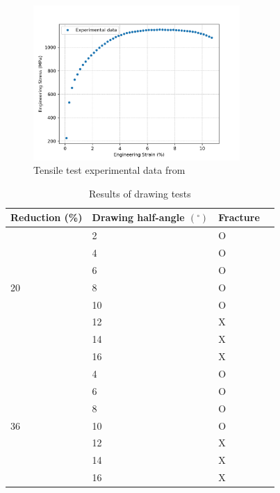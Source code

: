 \documentclass[sn-mathphys,Numbered,draft]{sn-jnl}%
\begin{document}
\begin{figure}[htb]
\begin{center}
	\includegraphics[width=0.7\textwidth]{./Figures/SimulationAndAnalysis/compareExperimentalSimulation/experimentalData.png}
\caption{Tensile test experimental data from \cite{roh_process_2021}}
\label{fig:notchedRoundBAr}
\end{center}
\end{figure}

\begin{table}[htb]
	\centering
		\begin{tabular}{llll} \hline
			Reduction (\%) & Drawing half-angle $(^{\circ})$ & Fracture  \\ \hline 
             & 2 & O \\
			 & 4 & O \\
   		 & 6 & O \\
      	20 & 8 & O \\
             & 10 & O \\
             & 12 & X \\
             & 14 & X \\
             & 16 & X \\
			\hline
			 & 4 & O \\
   		 & 6 & O \\
      	 & 8 & O \\
           36  & 10 & O \\
             & 12 & X \\
             & 14 & X \\
             & 16 & X \\
			\hline
		\end{tabular}
	\caption{Results of drawing tests \cite{roh_process_2021}}
	\label{tab:material_properties}
\end{table}
\end{document}
